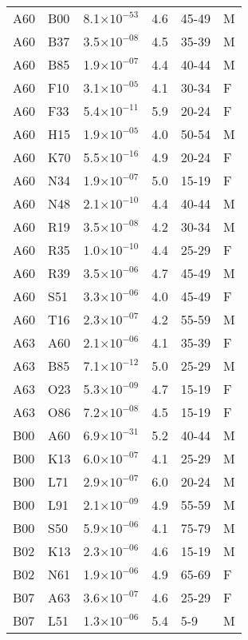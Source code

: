 \begin{longtable}{lllrll}
   A60 & B00 & 8.1$\times10^{-53}$ & 4.6 & 45-49 & M \\ 
   A60 & B37 & 3.5$\times10^{-08}$ & 4.5 & 35-39 & M \\ 
   A60 & B85 & 1.9$\times10^{-07}$ & 4.4 & 40-44 & M \\ 
   A60 & F10 & 3.1$\times10^{-05}$ & 4.1 & 30-34 & F \\ 
   A60 & F33 & 5.4$\times10^{-11}$ & 5.9 & 20-24 & F \\ 
   A60 & H15 & 1.9$\times10^{-05}$ & 4.0 & 50-54 & M \\ 
   A60 & K70 & 5.5$\times10^{-16}$ & 4.9 & 20-24 & F \\ 
   A60 & N34 & 1.9$\times10^{-07}$ & 5.0 & 15-19 & F \\ 
   A60 & N48 & 2.1$\times10^{-10}$ & 4.4 & 40-44 & M \\ 
   A60 & R19 & 3.5$\times10^{-08}$ & 4.2 & 30-34 & M \\ 
   A60 & R35 & 1.0$\times10^{-10}$ & 4.4 & 25-29 & F \\ 
   A60 & R39 & 3.5$\times10^{-06}$ & 4.7 & 45-49 & M \\ 
   A60 & S51 & 3.3$\times10^{-06}$ & 4.0 & 45-49 & F \\ 
   A60 & T16 & 2.3$\times10^{-07}$ & 4.2 & 55-59 & M \\ 
   A63 & A60 & 2.1$\times10^{-06}$ & 4.1 & 35-39 & F \\ 
   A63 & B85 & 7.1$\times10^{-12}$ & 5.0 & 25-29 & M \\ 
   A63 & O23 & 5.3$\times10^{-09}$ & 4.7 & 15-19 & F \\ 
   A63 & O86 & 7.2$\times10^{-08}$ & 4.5 & 15-19 & F \\ 
   B00 & A60 & 6.9$\times10^{-31}$ & 5.2 & 40-44 & M \\ 
   B00 & K13 & 6.0$\times10^{-07}$ & 4.1 & 25-29 & M \\ 
   B00 & L71 & 2.9$\times10^{-07}$ & 6.0 & 20-24 & M \\ 
   B00 & L91 & 2.1$\times10^{-09}$ & 4.9 & 55-59 & M \\ 
   B00 & S50 & 5.9$\times10^{-06}$ & 4.1 & 75-79 & M \\ 
   B02 & K13 & 2.3$\times10^{-06}$ & 4.6 & 15-19 & M \\ 
   B02 & N61 & 1.9$\times10^{-06}$ & 4.9 & 65-69 & F \\ 
   B07 & A63 & 3.6$\times10^{-07}$ & 4.6 & 25-29 & F \\ 
   B07 & L51 & 1.3$\times10^{-06}$ & 5.4 & 5-9 & M \\ 

\end{longtable}
